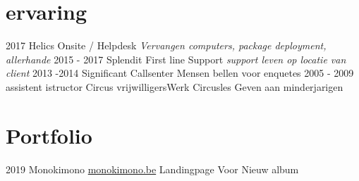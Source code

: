 \documentclass[]{friggeri-cv}
\begin{document}
\section{ervaring}

\begin{entrylist}

  \entry
    {2017}
    {Helics}
    {Onsite / Helpdesk}
    {\emph{Vervangen computers, package deployment, allerhande}}
  \entry
    {2015 - 2017}
    {Splendit}
    {First line Support}
    {\emph{support leven op locatie van client}}
  \entry
    {2013 -2014}
    {Significant}
    {Callsenter}
    {Mensen bellen voor enquetes}
  \entry
    {2005 - 2009}
    {assistent istructor Circus}
    {vrijwilligersWerk}
    {Circusles Geven aan minderjarigen}
\end{entrylist}

\section{Portfolio}

\begin{entrylist}
  \entry
    {2019}
    {Monokimono}
    {\href{http://monokimono.be}{monokimono.be}}
    {Landingpage Voor Nieuw album}

\end{entrylist}



% 
\end{document}
